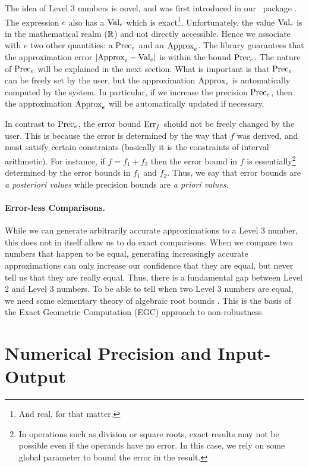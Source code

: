 \documentclass[12pt]{article}
\begin{document}
The idea of Level 3 numbers is novel, and
was first introduced in our \rexpr\ package \cite{yap-dube:paradigm}.
The expression $e$ also has a 
$\mbox{\rm Val}_e$ which is exact\footnote{
And real, for that matter.
}.  Unfortunately, the value $\mbox{\rm Val}_e$ is in the mathematical realm (${\mathbb R}$)
and not directly accessible.
Hence we associate with $e$ two other quantities:
a  $\mbox{\rm Prec}_e$ and an  $\mbox{\rm Approx}_e$.
The library guarantees that the approximation error $|\mbox{\rm Approx}_e - \mbox{\rm Val}_e|$
is within the bound $\mbox{\rm Prec}_e$.
The nature of $\mbox{\rm Prec}_e$ will be explained in the next section.
What is important is that $\mbox{\rm Prec}_e$ can be freely 
set by the user, but the approximation $\mbox{\rm Approx}_e$
is automatically computed by the system.
In particular, if we increase the precision
$\mbox{\rm Prec}_e$, then the approximation $\mbox{\rm Approx}_e$ will be
automatically updated if necessary.

In contrast to $\mbox{\rm Prec}_e$, the error bound $\mbox{\rm Err}_f$
should not be freely changed by the user.  This is because
the error is determined by the way that $f$ was derived, and must
satisfy certain constraints (basically it is the constraints
of interval arithmetic).
For instance, if $f=f_1+f_2$ then the error bound in $f$ is
essentially\footnote{
In operations such as division or square roots, exact results
may not be possible even if the operands
have no error.  In this case, we rely on some global parameter to
bound the error in the result.
}
determined by the error bounds in $f_1$ and $f_2$.
Thus, we say that error bounds are
{\em a posteriori values}
while precision bounds are
{\em a priori values.}

\paragraph{Error-less Comparisons.}
While we can generate arbitrarily accurate approximations to
a Level 3 number, 
this does not in itself allow us to do exact comparisons.
When we compare two numbers that happen to be equal,
generating increasingly accurate approximations can
only increase our confidence that they are equal, but
never tell us that they are really equal.
Thus, there is a fundamental gap between Level 2 and Level 3 numbers.
To be able to tell when two Level 3 numbers are equal,
we need some elementary theory
of algebraic root bounds \cite{yap:algebra-bk}.
This is the basis of the Exact Geometric Computation (EGC) approach
to non-robustness. 

\section{Numerical Precision and Input-Output}
\end{document}
